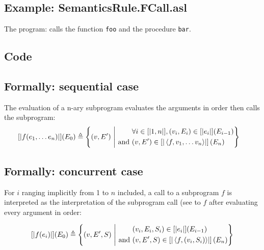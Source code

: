 \documentclass{book}
\begin{document}
  \subsection{Example: SemanticsRule.FCall.asl}
  The program:
  calls the function \texttt{foo} and the procedure \texttt{bar}.

  \subsection{Code}

\begin{formal}
  \subsection{Formally: sequential case}
  The evaluation of a n-ary subprogram evaluates the arguments in order then
  calls the subprogram:
  \begin{align}
  \left[| f (e_1, \dotsc e_n) \right|] (E_0) & \triangleq
    \left\{ (v, E') \ \middle|\ {}
    \begin{aligned}
      & \forall i \in [| 1, n |], (v_i, E_i) \in \left[| e_i \right|] (E_{i - 1})
      \\ \text{and}\ &
      (v, E') \in \left[| \left\langle f, v_1, \dotsc v_n \right\rangle \right|] \left(E_n\right)
    \end{aligned}
    \right\}
  \label{eq:sem-seq-fcall}
  \end{align}

  \subsection{Formally: concurrent case}
  For $i$ ranging implicitly from 1 to $n$ included, a call to a subprogram $f$
  is interpreted as the interpretation of the subprogram call (see to $f$ after
  evaluating every argument in order:

  \begin{align}
    \interp{f (e_i)} (E_0) \triangleq
      \left\{ (v, E', S) \st{}
      \begin{aligned}
        & %
          (v_i, E_i, S_i) \in \interp{e_i} (E_{i - 1})
        \\ \text{and}\ &
        (v, E', S) \in \interp{\left\langle f, (v_i,S_i) \right\rangle} \left(E_n\right)
      \end{aligned}
      \right\}
    \label{eq:sem-conc-fcall}
  \end{align}
\end{formal}
\end{document}
